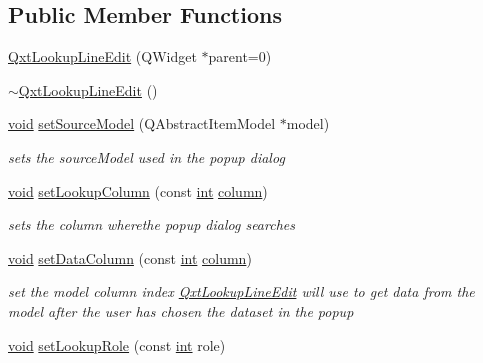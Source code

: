 \subsection*{Public Member Functions}
\begin{DoxyCompactItemize}
\item 
\hyperlink{class_qxt_lookup_line_edit_a9512e0cbe9c1ae6a67db85282ca1770e}{Qxt\-Lookup\-Line\-Edit} (Q\-Widget $\ast$parent=0)
\item 
\hyperlink{class_qxt_lookup_line_edit_a9c3c1209a809f9e46d4e17ec1fa56a3b}{$\sim$\-Qxt\-Lookup\-Line\-Edit} ()
\item 
\hyperlink{group___u_a_v_objects_plugin_ga444cf2ff3f0ecbe028adce838d373f5c}{void} \hyperlink{class_qxt_lookup_line_edit_a44217a2dbcf221389ee982dd1abcdd3f}{set\-Source\-Model} (Q\-Abstract\-Item\-Model $\ast$model)
\begin{DoxyCompactList}\small\item\em sets the source\-Model used in the popup dialog \end{DoxyCompactList}\item 
\hyperlink{group___u_a_v_objects_plugin_ga444cf2ff3f0ecbe028adce838d373f5c}{void} \hyperlink{class_qxt_lookup_line_edit_a689dc79bd5093656d67f19e3d2b65b46}{set\-Lookup\-Column} (const \hyperlink{ioapi_8h_a787fa3cf048117ba7123753c1e74fcd6}{int} \hyperlink{glext_8h_a3b58c39b1b7ca6f4012b27e84de3bdb3}{column})
\begin{DoxyCompactList}\small\item\em sets the column wherethe popup dialog searches \end{DoxyCompactList}\item 
\hyperlink{group___u_a_v_objects_plugin_ga444cf2ff3f0ecbe028adce838d373f5c}{void} \hyperlink{class_qxt_lookup_line_edit_ae8090fb697322fe82f761ce9329912f4}{set\-Data\-Column} (const \hyperlink{ioapi_8h_a787fa3cf048117ba7123753c1e74fcd6}{int} \hyperlink{glext_8h_a3b58c39b1b7ca6f4012b27e84de3bdb3}{column})
\begin{DoxyCompactList}\small\item\em set the model column index \hyperlink{class_qxt_lookup_line_edit}{Qxt\-Lookup\-Line\-Edit} will use to get data from the model after the user has chosen the dataset in the popup \end{DoxyCompactList}\item 
\hyperlink{group___u_a_v_objects_plugin_ga444cf2ff3f0ecbe028adce838d373f5c}{void} \hyperlink{class_qxt_lookup_line_edit_a6edbf781f8e82221341a238ca23b1676}{set\-Lookup\-Role} (const \hyperlink{ioapi_8h_a787fa3cf048117ba7123753c1e74fcd6}{int} role)

\end{DoxyCompactItemize}
